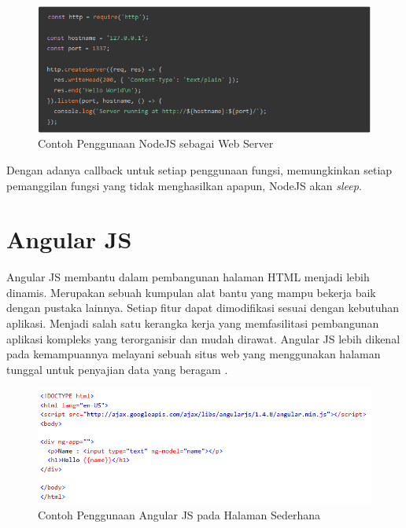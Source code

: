 \documentclass{ta-its}
\begin{document}
			\begin{figure}[h] %
				\centering
				\includegraphics[width=\linewidth]{contoh_img/contoh_nodejs}
				\caption{Contoh Penggunaan NodeJS sebagai Web Server}
				\label{contohNodeJS}
			\end{figure}
			
			
			Dengan adanya callback untuk setiap penggunaan fungsi, memungkinkan setiap pemanggilan fungsi yang tidak menghasilkan apapun, NodeJS akan \textit{sleep}.

        \section{Angular JS}
			Angular JS membantu dalam pembangunan halaman HTML menjadi lebih dinamis. Merupakan sebuah kumpulan alat bantu yang mampu bekerja baik dengan pustaka lainnya. Setiap fitur dapat dimodifikasi sesuai dengan kebutuhan aplikasi. Menjadi salah satu kerangka kerja yang memfasilitasi pembangunan aplikasi kompleks yang terorganisir dan mudah dirawat. Angular JS lebih dikenal pada kemampuannya melayani sebuah situs web yang menggunakan halaman tunggal untuk penyajian data yang beragam \cite{clientSideWeb}\cite{angularJS}.
			
			\begin{figure}[h] %
				\centering
				\includegraphics[width=\linewidth]{contoh_img/contoh_angular}
				\caption{Contoh Penggunaan Angular JS pada Halaman Sederhana}
				\label{contohAngularJS}
			\end{figure}
\end{document}
